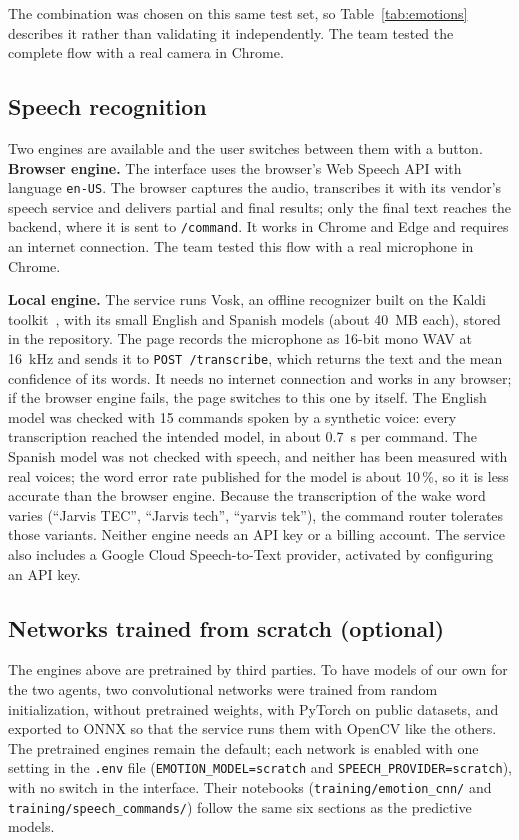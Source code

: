 \documentclass[11pt,letterpaper]{article}
\newcommand{\code}[1]{\texttt{#1}}
\begin{document}
The combination was chosen on this same test set, so Table~\ref{tab:emotions} describes it rather than validating it independently. The team tested the complete flow with a real camera in Chrome.

\subsection{Speech recognition}

Two engines are available and the user switches between them with a button. \textbf{Browser engine.} The interface uses the browser's Web Speech API with language \code{en-US}. The browser captures the audio, transcribes it with its vendor's speech service and delivers partial and final results; only the final text reaches the backend, where it is sent to \code{/command}. It works in Chrome and Edge and requires an internet connection. The team tested this flow with a real microphone in Chrome.

\textbf{Local engine.} The service runs Vosk, an offline recognizer built on the Kaldi toolkit~\cite{povey2011}, with its small English and Spanish models (about 40~MB each), stored in the repository. The page records the microphone as 16-bit mono WAV at 16~kHz and sends it to \code{POST /transcribe}, which returns the text and the mean confidence of its words. It needs no internet connection and works in any browser; if the browser engine fails, the page switches to this one by itself. The English model was checked with 15 commands spoken by a synthetic voice: every transcription reached the intended model, in about 0.7~s per command. The Spanish model was not checked with speech, and neither has been measured with real voices; the word error rate published for the model is about 10\,\%, so it is less accurate than the browser engine. Because the transcription of the wake word varies (``Jarvis TEC'', ``Jarvis tech'', ``yarvis tek''), the command router tolerates those variants. Neither engine needs an API key or a billing account. The service also includes a Google Cloud Speech-to-Text provider, activated by configuring an API key.

\subsection{Networks trained from scratch (optional)}

The engines above are pretrained by third parties. To have models of our own for the two agents, two convolutional networks were trained from random initialization, without pretrained weights, with PyTorch on public datasets, and exported to ONNX so that the service runs them with OpenCV like the others. The pretrained engines remain the default; each network is enabled with one setting in the \code{.env} file (\code{EMOTION\_MODEL=scratch} and \code{SPEECH\_PROVIDER=scratch}), with no switch in the interface. Their notebooks (\code{training/emotion\_cnn/} and \code{training/speech\_commands/}) follow the same six sections as the predictive models.
\end{document}
